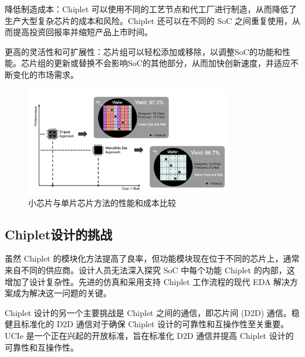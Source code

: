 降低制造成本：Chiplet 可以使用不同的工艺节点和代工厂进行制造，从而降低了生产大型复杂芯片的成本和风险。Chiplet 还可以在不同的 SoC 之间重复使用，从而提高投资回报率并缩短产品上市时间。

更高的灵活性和可扩展性：芯片组可以轻松添加或移除，以调整SoC的功能和性能。芯片组的更新或替换不会影响SoC的其他部分，从而加快创新速度，并适应不断变化的市场需求。

\begin{figure}[htbp]
	\centering
	\includegraphics[width=0.8\textwidth]{img/2.png} %
	\caption{小芯片与单片芯片方法的性能和成本比较 \cite{PiacentiniFilho2024Chiplet}}
	\label{fig:example}
\end{figure}

\pagebreak

\subsection{Chiplet设计的挑战}

虽然 Chiplet 的模块化方法提高了良率，但功能模块现在位于不同的芯片上，通常来自不同的供应商。设计人员无法深入探究 SoC 中每个功能 Chiplet 的内部，这增加了设计复杂性。先进的仿真和采用支持 Chiplet 工作流程的现代 EDA 解决方案成为解决这一问题的关键。

Chiplet 设计的另一个主要挑战是 Chiplet 之间的通信，即芯片间 (D2D) 通信。稳健且标准化的 D2D 通信对于确保 Chiplet 设计的可靠性和互操作性至关重要。UCIe 是一个正在兴起的开放标准，旨在标准化 D2D 通信并提高 Chiplet 设计的可靠性和互操作性。